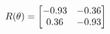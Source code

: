 \documentclass[preview]{standalone}
\begin{document}
\begin{align*}
\special{dvisvgm:raw <g id='unique000'>}R(\theta) = \begin{bmatrix}-0.93 & -0.36\\0.36 & -0.93\end{bmatrix}\special{dvisvgm:raw </g>}
\end{align*}
\end{document}
